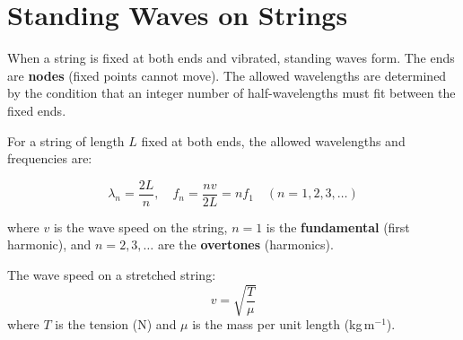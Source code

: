 \section{Standing Waves on Strings}

When a string is fixed at both ends and vibrated,
standing waves form. The ends are \textbf{nodes}
(fixed points cannot move). The allowed wavelengths
are determined by the condition that an integer
number of half-wavelengths must fit between the
fixed ends.

\begin{lawbox}
For a string of length $L$ fixed at both ends,
the allowed wavelengths and frequencies are:

\[
  \lambda_n = \frac{2L}{n}, \quad
  f_n = \frac{nv}{2L} = nf_1
  \quad (n = 1, 2, 3, \ldots)
\]

where $v$ is the wave speed on the string,
$n = 1$ is the \textbf{fundamental} (first harmonic),
and $n = 2, 3, \ldots$ are the
\textbf{overtones} (harmonics).

The wave speed on a stretched string:
\[
  v = \sqrt{\frac{T}{\mu}}
\]
where $T$ is the tension (N) and
$\mu$ is the mass per unit length (kg\,m$^{-1}$).
\end{lawbox}

